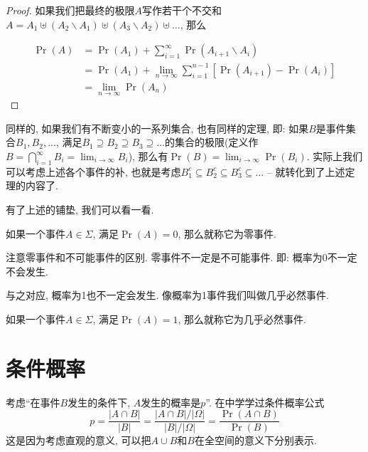 \documentclass{ctexart}
\begin{document}
\begin{proof}
     如果我们把最终的极限$A$写作若干个不交和$A=A_1 \uplus\left(A_2 \backslash A_1\right) \uplus\left(A_3 \backslash A_2\right) \uplus \ldots$, 那么

    $$
\begin{aligned}
\operatorname{Pr}(A) & =\operatorname{Pr}\left(A_1\right)+\sum_{i=1}^{\infty} \operatorname{Pr}\left(A_{i+1} \backslash A_i\right) \\
& =\operatorname{Pr}\left(A_1\right)+\lim _{n \rightarrow \infty} \sum_{i=1}^{n-1}\left[\operatorname{Pr}\left(A_{i+1}\right)-\operatorname{Pr}\left(A_i\right)\right] \\
& =\lim _{n \rightarrow \infty} \operatorname{Pr}\left(A_n\right)
\end{aligned}
$$
\end{proof}


同样的, 如果我们有不断变小的一系列集合, 也有同样的定理, 即: 如果$B$是事件集合$B_1,B_2, ...$, 满足$B_1 \supseteq B_2 \supseteq B_3 \supseteq \ldots$的集合的极限(定义作$B=\bigcap_{i=1}^{\infty} B_i=\lim _{i \rightarrow \infty} B_i$), 那么有$\operatorname{Pr}(B)=\lim _{i \rightarrow \infty} \operatorname{Pr}\left(B_i\right)$. 实际上我们可以考虑上述各个事件的补, 也就是考虑$B_1^c \subseteq B_2^c \subseteq B_3^c \subseteq \ldots$ -- 就转化到了上述定理的内容了. 


有了上述的铺垫, 我们可以看一看. 

\begin{definition}[零事件]
    如果一个事件$A\in \Sigma$, 满足$\Pr(A)=0$, 那么就称它为零事件.
\end{definition}

注意零事件和不可能事件的区别. 零事件不一定是不可能事件. 即: 概率为0不一定不会发生.

与之对应, 概率为1也不一定会发生. 像概率为1事件我们叫做几乎必然事件.
\begin{definition}
如果一个事件$A\in \Sigma$, 满足$\Pr(A)=1$, 那么就称它为几乎必然事件.
\end{definition}

\section{条件概率} 考虑``在事件$B$发生的条件下, $A$发生的概率是$p$''. 在中学学过条件概率公式
$$p=\frac{|A \cap B|}{|B|}=\frac{|A \cap B| /|\Omega|}{|B| /|\Omega|}=\frac{\operatorname{Pr}(A \cap B)}{\operatorname{Pr}(B)}$$
这是因为考虑直观的意义, 可以把$A\cup B$和$B$在全空间的意义下分别表示. 
\end{document}
